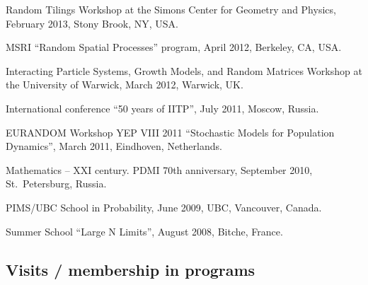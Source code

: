\documentclass[letterpaper,11pt]{article}
\begin{document}
\begin{etaremune}
	\item
	      Random Tilings Workshop at the Simons Center for Geometry and
	      Physics, February 2013, Stony Brook, NY, USA.

	\item
	      MSRI ``Random Spatial Processes'' program, April 2012, Berkeley,
	      CA, USA.

	\item
	      Interacting Particle Systems, Growth Models, and Random Matrices
	      Workshop at the University of Warwick, March 2012, Warwick, UK.

	\item
	      International conference ``50 years of IITP'', July 2011,
	      Moscow, Russia.

	\item
	      EURANDOM Workshop YEP VIII 2011 ``Stochastic Models for
	      Population Dynamics'', March 2011, Eindhoven, Netherlands.

	\item
	      Mathematics -- XXI century. PDMI 70th anniversary, September
	      2010, St.~Petersburg, Russia.

	\item
	      PIMS/UBC School in Probability, June 2009, UBC, Vancouver,
	      Canada.

	\item
	      Summer School ``Large N Limits'', August 2008, Bitche, France.
\end{etaremune}

\subsection*{Visits / membership in programs}
\end{document}
